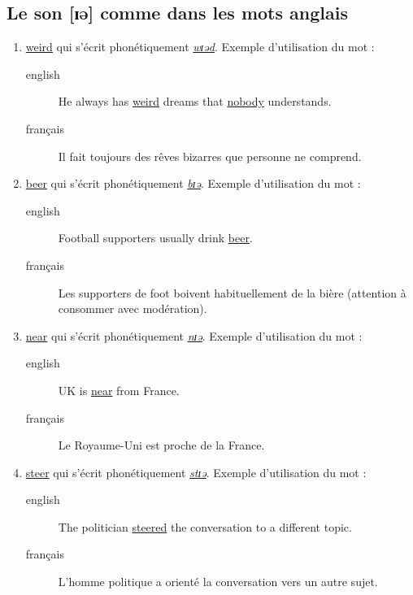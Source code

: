 \documentclass[12pt,a4paper]{book}
\begin{document}
\subsection{Le son [ɪə] comme dans les mots anglais}
\label{sec:org2e2326e}
\begin{enumerate}
\item \href{http://www.wordreference.com/enfr/weird}{weird} qui s'écrit phonétiquement \href{https://en.oxforddictionaries.com/definition/weird}{\emph{wɪəd}}. Exemple d'utilisation du mot :
\begin{description}
\item[{english}] \textenglish{He always has \href{https://youtu.be/fcdUXnt87ng}{weird} dreams that \href{https://youtu.be/FikYhD7bXYE}{nobody} understands.}
\item[{français}] Il fait toujours des rêves bizarres que personne ne
comprend.
\end{description}
\item \href{http://www.wordreference.com/enfr/beer}{beer} qui s'écrit phonétiquement \href{https://en.oxforddictionaries.com/definition/beer}{\emph{bɪə}}. Exemple d'utilisation du mot :
\begin{description}
\item[{english}] \textenglish{Football supporters usually drink \href{https://youtu.be/I1fsk4k-bOs}{beer}.}
\item[{français}] Les supporters de foot boivent habituellement de la
bière (attention à consommer avec modération).
\end{description}
\item \href{http://www.wordreference.com/enfr/near}{near} qui s'écrit phonétiquement \href{https://en.oxforddictionaries.com/definition/near}{\emph{nɪə}}. Exemple d'utilisation du mot : 
\begin{description}
\item[{english}] \textenglish{UK is \href{https://youtu.be/xIS9K-bNt3M}{near} from France.}
\item[{français}] Le Royaume-Uni est proche de la France.
\end{description}
\item \href{http://www.wordreference.com/enfr/steer}{steer} qui s'écrit phonétiquement \href{https://en.oxforddictionaries.com/definition/steer}{\emph{stɪə}}. Exemple d'utilisation du mot :
\begin{description}
\item[{english}] \textenglish{The politician \href{https://youtu.be/z\_vSRFODAxU}{steered} the conversation to a different
topic.}
\item[{français}] L'homme politique a orienté la conversation vers un autre sujet.
\end{description}
\end{enumerate}
\end{document}
